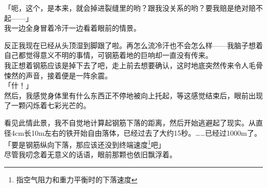 「呃，这个，是本来，就会掉进裂缝里的哟？跟我没关系的哟？要我赔是绝对赔不起——」\\

我一边全身冒着冷汗一边看着眼前的情景。

反正我现在已经从头顶湿到脚跟了啦。再怎么流冷汗也不会怎么样——我脑子想着自己都觉得意义不明的事情，可钢筋着地的巨响却一直没有传来。\\

我正想着钢筋应该是掉下去了吧，走上前去想要确认，这时地底突然传来令人毛骨悚然的声音，接着便是一阵余震。\\

「什！」\\

然后，我感觉身体里有什么东西正不停地被向上托起，等这感觉结束后，眼前出现了一颗闪烁着七彩光芒的。

看见此情此景，我不自觉地计算起钢筋下落的距离，然后开始逃避起了现实。从直径4cm长10m左右的铁开始自由落体，已经过去了大约15秒。……已经过1000m了。\\

「要是钢筋纵向下落，那应该还没到终端速度\footnote{指空气阻力和重力平衡时的下落速度}吧」\\

尽管我叨念着无意义的话语，眼前那颗也依旧飘浮着。
